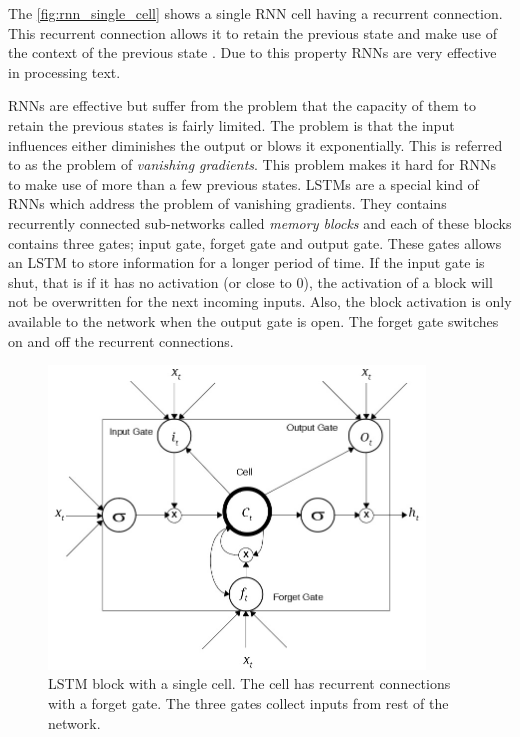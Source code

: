 The \ref{fig:rnn_single_cell} shows a single RNN cell having a recurrent connection. This recurrent connection allows it to retain the previous state and make use of the context of the previous state \cite{graves2009novel}. Due to this property RNNs are very effective in processing text. 

RNNs are effective but suffer from the problem that the capacity of them to retain the previous states is fairly limited. The problem is that the input influences either diminishes the output or blows it exponentially. This is referred to as the problem of \textit{vanishing gradients}\cite{hochreiter2001gradient}. This problem makes it hard for RNNs to make use of more than a few previous states. LSTMs are a special kind of RNNs which address the problem of vanishing gradients. They contains recurrently connected sub-networks called \textit{memory blocks} and each of these blocks contains three gates; input gate, forget gate and output gate. These gates allows an LSTM to store information for a longer period of time. If the input gate is shut, that is if it has no activation (or close to 0), the activation of a block will not be overwritten for the next incoming inputs. Also, the block activation is only available to the network when the output gate is open. The forget gate switches on and off the recurrent connections.

\begin{figure}[!htbp]
    \centering
    \includegraphics[width=10cm]{pics/lstm.jpg}
    \captionsetup{justification=centering,margin=2cm}
    \caption{LSTM block with a single cell. The cell has recurrent connections with a forget gate. The three gates collect inputs from rest of the network. }
    \label{fig:LSTM_BLOCK}
\end{figure}


